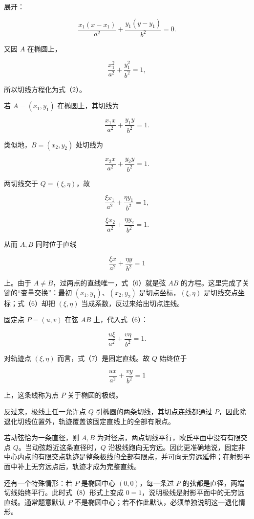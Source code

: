 \documentclass[12pt,a4paper,UTF8]{ctexart}
\begin{document}
展开：

\[
\frac{x_1(x-x_1)}{a^2}
+\frac{y_1(y-y_1)}{b^2}=0.
\]

又因 \(A\) 在椭圆上，

\[
\frac{x_1^2}{a^2}+\frac{y_1^2}{b^2}=1,
\]

所以切线方程化为式（2）。

若 \(A=(x_1,y_1)\) 在椭圆上，其切线为

\[
\frac{x_1x}{a^2}+\frac{y_1y}{b^2}=1.
\tag{2}
\]

类似地，\(B=(x_2,y_2)\) 处切线为

\[
\frac{x_2x}{a^2}+\frac{y_2y}{b^2}=1.
\tag{3}
\]

两切线交于 \(Q=(\xi,\eta)\)，故

\[
\frac{\xi x_1}{a^2}+\frac{\eta y_1}{b^2}=1,
\tag{4}
\]

\[
\frac{\xi x_2}{a^2}+\frac{\eta y_2}{b^2}=1.
\tag{5}
\]

从而 \(A,B\) 同时位于直线

\[
\frac{\xi x}{a^2}+\frac{\eta y}{b^2}=1
\tag{6}
\]

上。由于 \(A\ne B\)，过两点的直线唯一，式（6）就是弦 \(AB\)
的方程。这里完成了关键的``变量交换''：最初 \((x_1,y_1)\)、\((x_2,y_2)\)
是切点坐标，\((\xi,\eta)\) 是切线交点坐标；式（6）却把 \((\xi,\eta)\)
当成系数，反过来给出切点连线。

固定点 \(P=(u,v)\) 在弦 \(AB\) 上，代入式（6）：

\[
\boxed{
\frac{u\xi}{a^2}+\frac{v\eta}{b^2}=1
}.
\tag{7}
\]

对轨迹点 \((\xi,\eta)\) 而言，式（7）是固定直线。故 \(Q\) 始终位于

\[
\boxed{
\frac{ux}{a^2}+\frac{vy}{b^2}=1
}
\tag{8}
\]

上，这条线称为点 \(P\) 关于椭圆的极线。

反过来，极线上任一允许点 \(Q\) 引椭圆的两条切线，其切点连线都通过
\(P\)，因此除退化切线位置外，轨迹覆盖该固定直线上的全部有限点。

若动弦恰为一条直径，则 \(A,B\)
为对径点，两点切线平行，欧氏平面中没有有限交点
\(Q\)。当动弦趋近这条直径时，\(Q\)
沿极线跑向无穷远。因此更准确地说，固定非中心内点的有限交点轨迹是整条极线的全部有限点，并可向无穷远延伸；在射影平面中补上无穷远点后，轨迹才成为完整直线。

还有一个特殊情形：若 \(P\) 是椭圆中心 \((0,0)\)，每一条过 \(P\)
的弦都是直径，两端切线始终平行。此时式（8）形式上变成
\(0=1\)，说明极线是射影平面中的无穷远直线。通常题意默认 \(P\)
不是椭圆中心；若不作此默认，必须单独说明这一退化情形。
\end{document}

